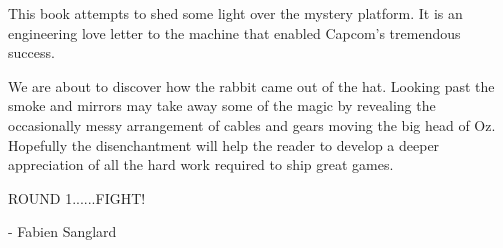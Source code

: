 This book attempts to shed some light over the mystery platform. It is an engineering love letter to the machine that enabled Capcom's tremendous success. 

We are about to discover how the rabbit came out of the hat. Looking past the smoke and mirrors may take away some of the magic by revealing the occasionally messy arrangement of cables and gears moving the big head of Oz. Hopefully the disenchantment will help the reader to develop a deeper appreciation of all the hard work required to ship great games.

ROUND 1......FIGHT!

- Fabien Sanglard